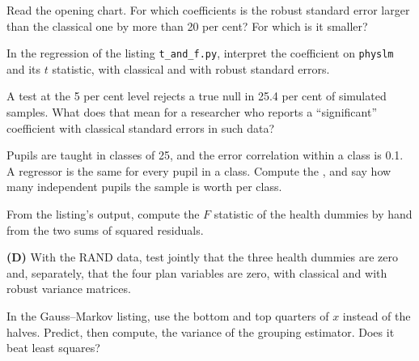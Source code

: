 \begin{exercise}[$\star$]\label{exo:b2:regression-inference:1}
Read the opening chart. For which coefficients is the robust standard error larger than the classical one by more than 20
per cent? For which is it smaller?
\end{exercise}

\begin{exercise}[$\star$]\label{exo:b2:regression-inference:2}
In the regression of the listing \texttt{t\_and\_f.py}, interpret the coefficient on \texttt{physlm} and its $t$
statistic, with classical and with robust standard errors.
\end{exercise}

\begin{exercise}[$\star$]\label{exo:b2:regression-inference:3}
A test at the 5 per cent level rejects a true null in 25.4 per cent of simulated samples. What does that mean for a
researcher who reports a ``significant'' coefficient with classical standard errors in such data?
\end{exercise}

\begin{exercise}[$\star$]\label{exo:b2:regression-inference:4}
Pupils are taught in classes of 25, and the error correlation within a class is 0.1. A regressor is the same for every
pupil in a class. Compute the , and say how many independent pupils the sample is worth per class.
\end{exercise}

\begin{exercise}[$\star\star$]\label{exo:b2:regression-inference:5}
From the listing's output, compute the $F$ statistic of the health dummies by hand from the two sums of squared residuals.
\end{exercise}

\begin{exercise}[$\star\star$]\label{exo:b2:regression-inference:6}
\textbf{(D)} With the RAND data, test jointly that the three health dummies are zero and, separately, that the four plan
variables are zero, with classical and with robust variance matrices.
\end{exercise}

\begin{exercise}[$\star\star$]\label{exo:b2:regression-inference:7}
In the Gauss--Markov listing, use the bottom and top quarters of $x$ instead of the halves. Predict, then compute, the
variance of the grouping estimator. Does it beat least squares?
\end{exercise}

